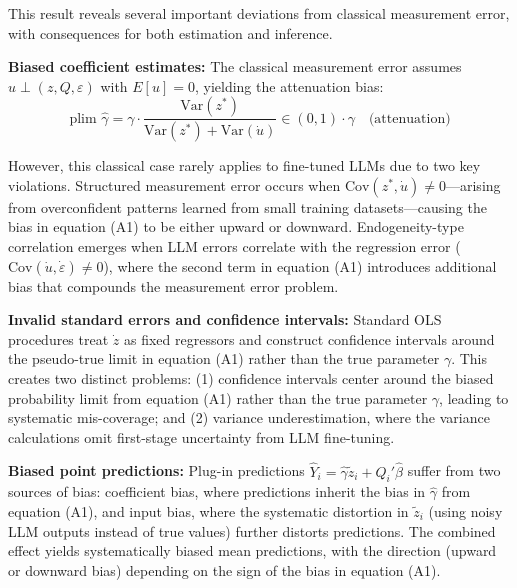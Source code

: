 \documentclass[11pt]{article}
\begin{document}
This result reveals several important deviations from classical measurement error, with consequences for both estimation and inference.

\textbf{Biased coefficient estimates:} The classical measurement error assumes $u \perp (z, Q, \varepsilon)$ with $E[u] = 0$,
yielding the attenuation bias:
\begin{equation}
\text{plim } \hat{\gamma} = \gamma \cdot \frac{\text{Var}(z^*)}{\text{Var}(z^*) + \text{Var}(\dot{u})} \in (0,1) \cdot \gamma \quad \text{(attenuation)} \tag{A2}
\end{equation}

However, this classical case rarely applies to fine-tuned LLMs due to two key violations. 
Structured measurement error occurs when $\text{Cov}(z^*, \dot{u}) \neq 0$—arising from overconfident 
patterns learned from small training datasets—causing the bias in equation (A1) to be either upward or downward. 
Endogeneity-type correlation emerges when LLM errors correlate with the regression error ($\text{Cov}(\dot{u}, \dot{\varepsilon}) \neq 0$), 
where the second term in equation (A1) introduces additional bias that compounds the measurement error problem.

\textbf{Invalid standard errors and confidence intervals:} Standard OLS procedures treat $\dot{z}$ as fixed regressors and construct confidence intervals 
around the pseudo-true limit in equation (A1) rather than the true parameter $\gamma$. 
This creates two distinct problems: (1) confidence intervals center around the biased probability limit from equation (A1)
rather than the true parameter $\gamma$, leading to systematic mis-coverage; and (2) variance underestimation,
where the variance calculations omit first-stage uncertainty from LLM fine-tuning.

\textbf{Biased point predictions:} Plug-in predictions $\hat{Y}_i = \hat{\gamma} \tilde{z}_i + Q_i'\hat{\beta}$ 
suffer from two sources of bias: coefficient bias, where predictions inherit the bias in $\hat{\gamma}$ from equation (A1),
and input bias, where the systematic distortion in $\tilde{z}_i$
(using noisy LLM outputs instead of true values) further distorts predictions. 
The combined effect yields systematically biased mean predictions, with the direction (upward or downward bias)
depending on the sign of the bias in equation (A1).
\end{document}
